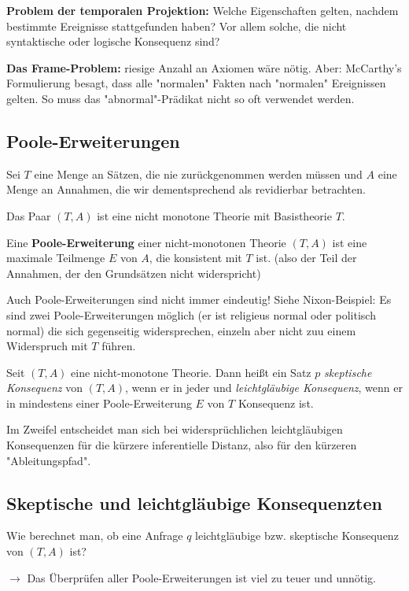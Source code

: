 \documentclass[runningheads,deutsch]{llncs}
\begin{document}
\textbf{Problem der temporalen Projektion:} Welche Eigenschaften gelten, nachdem bestimmte Ereignisse stattgefunden haben? Vor allem solche, die nicht syntaktische oder logische Konsequenz sind?

\textbf{Das Frame-Problem:} riesige Anzahl an Axiomen wäre nötig. Aber: McCarthy's Formulierung besagt, dass alle "normalen" Fakten nach "normalen" Ereignissen gelten. So muss das "abnormal"-Prädikat nicht so oft verwendet werden. %

\subsection{Poole-Erweiterungen}

Sei $T$ eine Menge an Sätzen, die nie zurückgenommen werden müssen und $A$ eine Menge an Annahmen, die wir dementsprechend als revidierbar betrachten.

Das Paar $(T,A)$ ist eine nicht monotone Theorie mit Basistheorie $T$.

Eine \textbf{Poole-Erweiterung} einer nicht-monotonen Theorie $(T,A)$ ist eine maximale Teilmenge $E$ von $A$, die konsistent mit $T$ ist. (also der Teil der Annahmen, der den Grundsätzen nicht widerspricht)

Auch Poole-Erweiterungen sind nicht immer eindeutig! Siehe Nixon-Beispiel: Es sind zwei Poole-Erweiterungen möglich (er ist religieus normal oder politisch normal) die sich gegenseitig widersprechen, einzeln aber nicht zuu einem Widerspruch mit $T$ führen.

Seit $(T,A)$ eine nicht-monotone Theorie. Dann heißt ein Satz $p$ \textit{skeptische Konsequenz} von $(T,A)$, wenn er in jeder und \textit{leichtgläubige Konsequenz}, wenn er in mindestens einer Poole-Erweiterung $E$ von $T$ Konsequenz ist.

Im Zweifel entscheidet man sich bei widersprüchlichen leichtgläubigen Konsequenzen für die kürzere inferentielle Distanz, also für den kürzeren "Ableitungspfad".

\subsection{Skeptische und leichtgläubige Konsequenzten}

Wie berechnet man, ob eine Anfrage $q$ leichtgläubige bzw. skeptische Konsequenz von $(T,A)$ ist?

\par $\rightarrow$ Das Überprüfen aller Poole-Erweiterungen ist viel zu teuer und unnötig.
\end{document}
